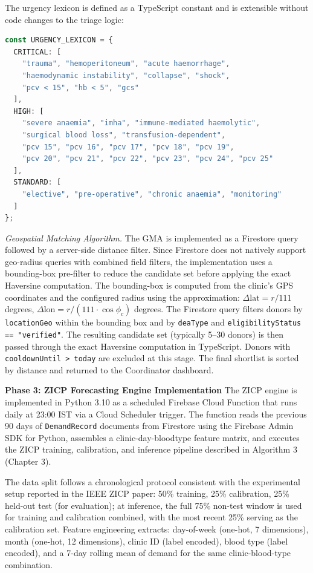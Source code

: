 \documentclass[12pt,a4paper]{article}
\begin{document}
\noindent The urgency lexicon is defined as a TypeScript constant and is extensible without code changes to the triage logic:

\begin{lstlisting}[language=TypeScript, caption={NLP urgency lexicon (excerpt)}]
const URGENCY_LEXICON = {
  CRITICAL: [
    "trauma", "hemoperitoneum", "acute haemorrhage",
    "haemodynamic instability", "collapse", "shock",
    "pcv < 15", "hb < 5", "gcs"
  ],
  HIGH: [
    "severe anaemia", "imha", "immune-mediated haemolytic",
    "surgical blood loss", "transfusion-dependent",
    "pcv 15", "pcv 16", "pcv 17", "pcv 18", "pcv 19",
    "pcv 20", "pcv 21", "pcv 22", "pcv 23", "pcv 24", "pcv 25"
  ],
  STANDARD: [
    "elective", "pre-operative", "chronic anaemia", "monitoring"
  ]
};
\end{lstlisting}

\noindent\textit{Geospatial Matching Algorithm.} The GMA is implemented as a Firestore query followed by a server-side distance filter. Since Firestore does not natively support geo-radius queries with combined field filters, the implementation uses a bounding-box pre-filter to reduce the candidate set before applying the exact Haversine computation. The bounding-box is computed from the clinic's GPS coordinates and the configured radius using the approximation: $\Delta\text{lat} = r / 111$ degrees, $\Delta\text{lon} = r / (111 \cdot \cos\phi_c)$ degrees. The Firestore query filters donors by \texttt{locationGeo} within the bounding box and by \texttt{deaType} and \texttt{eligibilityStatus == "verified"}. The resulting candidate set (typically 5--30 donors) is then passed through the exact Haversine computation in TypeScript. Donors with \texttt{cooldownUntil > today} are excluded at this stage. The final shortlist is sorted by distance and returned to the Coordinator dashboard.

\noindent\textbf{Phase 3: ZICP Forecasting Engine Implementation}
\noindent The ZICP engine is implemented in Python 3.10 as a scheduled Firebase Cloud Function that runs daily at 23:00 IST via a Cloud Scheduler trigger. The function reads the previous 90 days of \texttt{DemandRecord} documents from Firestore using the Firebase Admin SDK for Python, assembles a clinic-day-bloodtype feature matrix, and executes the ZICP training, calibration, and inference pipeline described in Algorithm 3 (Chapter 3).

\noindent The data split follows a chronological protocol consistent with the experimental setup reported in the IEEE ZICP paper: 50\% training, 25\% calibration, 25\% held-out test (for evaluation); at inference, the full 75\% non-test window is used for training and calibration combined, with the most recent 25\% serving as the calibration set. Feature engineering extracts: day-of-week (one-hot, 7 dimensions), month (one-hot, 12 dimensions), clinic ID (label encoded), blood type (label encoded), and a 7-day rolling mean of demand for the same clinic-blood-type combination.
\end{document}
